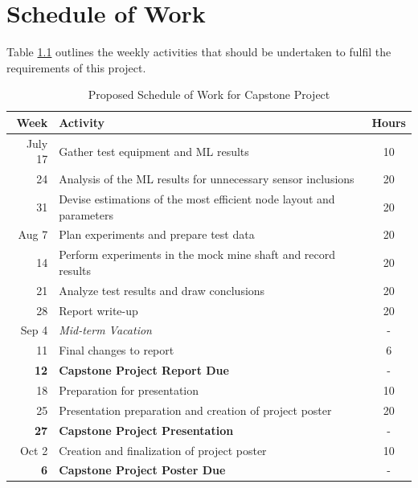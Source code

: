 \documentclass[a4paper,twoside,12pt]{report}
\begin{document}
\chapter{Schedule of Work}
Table \ref{tab:workScheduleTable} outlines the weekly activities that should be undertaken to fulfil the requirements of this project.
\begin{table}[!htbp]
	\centering
	\caption{Proposed Schedule of Work for Capstone Project}
	\label{tab:workScheduleTable}
\begin{tabular}{| r | l | c |}
	\hline
	\textbf{Week} & \textbf{Activity} & \textbf{Hours}\\
	\hline\hline 
	July 17 & Gather test equipment and ML results  & 10 \\ 
	24 & Analysis of the ML results for unnecessary sensor inclusions & 20 \\ 
    31 & Devise estimations of the most efficient node layout and parameters & 20 \\ 
    \hline
    Aug 7 & Plan experiments and prepare test data & 20 \\ 
    14 & Perform experiments in the mock mine shaft and record results & 20 \\ 
    21 & Analyze test results and draw conclusions & 20 \\ 
    28 & Report write-up & 20 \\ 
    \hline
    Sep 4 & \textit{Mid-term Vacation} & - \\ 
    11 & Final changes to report & 6 \\ 
    \textbf{12} & \textbf{Capstone Project Report Due} & - \\ 
    18 & Preparation for presentation & 10 \\
    25 & Presentation preparation and creation of project poster & 20 \\
    \textbf{27} & \textbf{Capstone Project Presentation} & - \\ 
	\hline
    Oct 2 & Creation and finalization of project poster & 10 \\
    \textbf{6} & \textbf{Capstone Project Poster Due} & - \\ 
    \hline
\end{tabular} 
\end{table}


\nocite{*}

\end{document}
